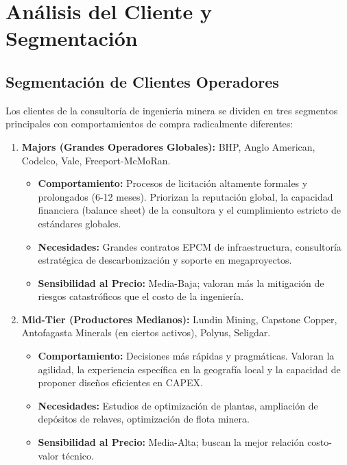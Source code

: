 \chapter{Análisis del Cliente y Segmentación}

\section{Segmentación de Clientes Operadores}
Los clientes de la consultoría de ingeniería minera se dividen en tres segmentos principales con comportamientos de compra radicalmente diferentes:

\begin{enumerate}
    \item \textbf{Majors (Grandes Operadores Globales):} BHP, Anglo American, Codelco, Vale, Freeport-McMoRan.
    \begin{itemize}
        \item \textbf{Comportamiento:} Procesos de licitación altamente formales y prolongados (6-12 meses). Priorizan la reputación global, la capacidad financiera (balance sheet) de la consultora y el cumplimiento estricto de estándares globales.
        \item \textbf{Necesidades:} Grandes contratos EPCM de infraestructura, consultoría estratégica de descarbonización y soporte en megaproyectos.
        \item \textbf{Sensibilidad al Precio:} Media-Baja; valoran más la mitigación de riesgos catastróficos que el costo de la ingeniería.
    \end{itemize}

    \item \textbf{Mid-Tier (Productores Medianos):} Lundin Mining, Capstone Copper, Antofagasta Minerals (en ciertos activos), Polyus, Seligdar.
    \begin{itemize}
        \item \textbf{Comportamiento:} Decisiones más rápidas y pragmáticas. Valoran la agilidad, la experiencia específica en la geografía local y la capacidad de proponer diseños eficientes en CAPEX.
        \item \textbf{Necesidades:} Estudios de optimización de plantas, ampliación de depósitos de relaves, optimización de flota minera.
        \item \textbf{Sensibilidad al Precio:} Media-Alta; buscan la mejor relación costo-valor técnico.
    \end{itemize}


\end{enumerate}
